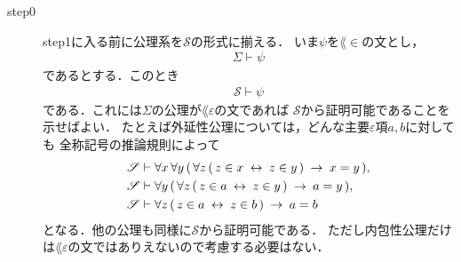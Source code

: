 	\begin{description}
		\item[step0]
			step1に入る前に公理系を$\mathscr{S}$の形式に揃える．
			いま$\psi$を$\lang{\in}$の文とし，
			\begin{align}
				\Sigma \vdash \psi
			\end{align}
			であるとする．このとき
			\begin{align}
				\mathscr{S} \vdash \psi
			\end{align}
			である．これには$\Sigma$の公理が$\lang{\varepsilon}$の文であれば
			$\mathscr{S}$から証明可能であることを示せばよい．
			たとえば外延性公理については，どんな主要$\varepsilon$項$a,b$に対しても
			全称記号の推論規則によって
			\begin{align}
				\mathscr{S} &\vdash \forall x\, \forall y\, (\, \forall z\, 
					(\, z \in x \hspace{0.25em}\leftrightarrow\hspace{0.25em} z \in y\, ) \hspace{0.25em}\rightarrow\hspace{0.25em} x = y\, ), \\
				\mathscr{S} &\vdash \forall y\, (\, \forall z\, 
					(\, z \in a \hspace{0.25em}\leftrightarrow\hspace{0.25em} z \in y\, ) \hspace{0.25em}\rightarrow\hspace{0.25em} a = y\, ), \\
				\mathscr{S} &\vdash \forall z\, 
					(\, z \in a \hspace{0.25em}\leftrightarrow\hspace{0.25em} z \in b\, ) \hspace{0.25em}\rightarrow\hspace{0.25em} a = b
			\end{align}
			となる．他の公理も同様に$\mathscr{S}$から証明可能である．
			ただし内包性公理だけは$\lang{\varepsilon}$の文ではありえないので考慮する必要はない．
			

\end{description}
